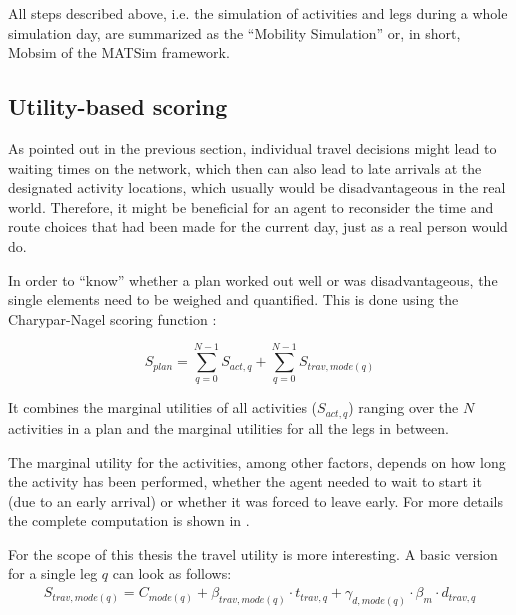 All steps described above, i.e. the simulation of activities and legs during
a whole simulation day, are summarized as the ``Mobility Simulation'' or, in short, Mobsim
of the MATSim framework.

\subsection{Utility-based scoring}
\label{sec:utility}

As pointed out in the previous section, individual travel decisions might lead to
waiting times on the network, which then can also lead to late arrivals at the
designated activity locations, which usually would be disadvantageous in the real
world. Therefore, it might be beneficial for an agent to reconsider the time and
route choices that had been made for the current day, just as a real person
would do.

In order to ``know'' whether a plan worked out well or was disadvantageous, the
single elements need to be weighed and quantified. This is done using the Charypar-Nagel
scoring function \citep[pp. 27]{Horni2015}:


\begin{equation}
S_{plan} = \sum_{q=0}^{N-1} S_{act,q} + \sum_{q=0}^{N-1} S_{trav,mode(q)}
\end{equation}

It combines the marginal utilities of all activities ($S_{act,q}$) ranging
over the $N$ activities in a plan and the marginal utilities for all the legs in
between.

The marginal utility for the activities, among other factors, depends on how long
the activity has been performed, whether the agent needed to wait to start it (due
to an early arrival) or whether it was forced to leave early. For more details
the complete computation is shown in \citet{Horni2015}.

For the scope of this thesis the travel utility is more interesting. A basic version
for a single leg $q$ can look as follows:
\begin{equation}\begin{aligned}
S_{trav,mode(q)} = C_{mode(q)} + \beta_{trav,mode(q)} \cdot t_{trav,q} + \gamma_{d,mode(q)} \cdot \beta_{m} \cdot d_{trav,q}
\end{aligned}\end{equation}

